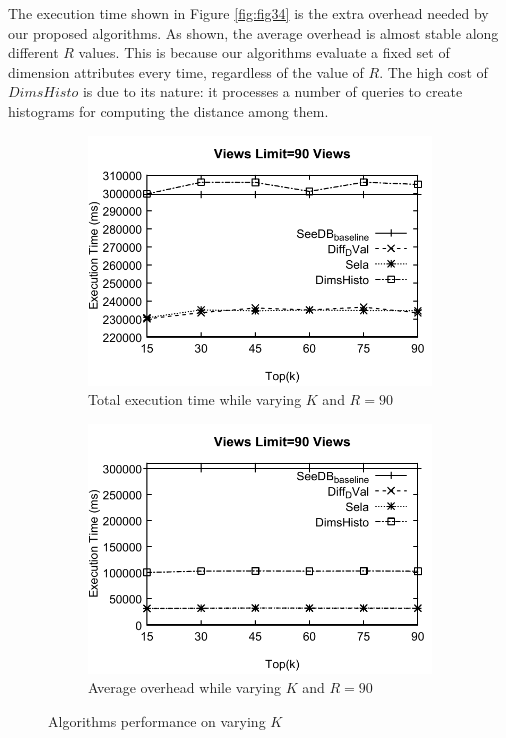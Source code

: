 The execution time shown in Figure \ref{fig:fig34} is the extra overhead needed by our proposed algorithms.
%
As shown, the average overhead is almost stable along different $R$ values.
%
This is because our algorithms evaluate a fixed set of dimension attributes every time, regardless of the value of $R$. 
%
The high cost of $DimsHisto$ is due to its nature: it processes a number of queries to create histograms for computing the distance among them.

\begin{figure}[t]
   \centering
  \begin{subfigure}[b]{0.42\textwidth}
    \includegraphics[width=\textwidth]{31.pdf}
    \caption{Total execution time while varying $K$ and $R=90$}
    \label{fig:fig31a}
  \end{subfigure}
  \begin{subfigure}[b]{0.42\textwidth}
    \includegraphics[width=\textwidth]{32.pdf}
    \caption{Average overhead while varying $K$ and $R=90$}
    \label{fig:fig32}
  \end{subfigure}
  \caption{Algorithms performance on varying $K$}
\end{figure}

